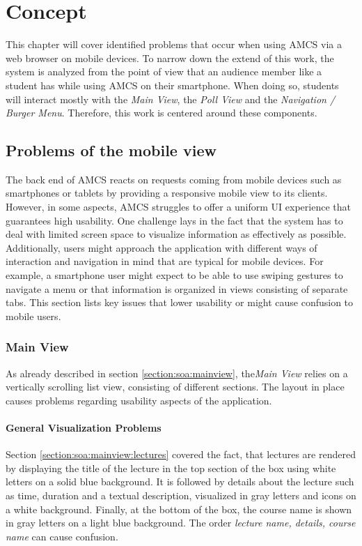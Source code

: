 \chapter{Concept}
\label{chapter:concept}
This chapter will cover identified problems that occur when using AMCS via a web browser on mobile
devices. To narrow down the extend of this work, the system is analyzed from the point of view that an audience member like a student has while using AMCS on their smartphone. When doing so, students will interact mostly with the \emph{Main View}, the \emph{Poll View} and the \emph{Navigation / Burger Menu}. Therefore, this work is centered around these components.

\section{Problems of the mobile view}
\label{section:con:problems}
The back end of AMCS reacts on requests coming from mobile devices such as smartphones or tablets by providing a responsive mobile view to its clients. However, in some aspects, AMCS struggles to offer a uniform UI experience that guarantees high usability.
One challenge lays in the fact that the system has to deal with limited screen space to visualize information as effectively as possible. Additionally, users might approach the application with different ways of interaction and navigation in mind that are typical for mobile devices. For example, a smartphone user might expect to be able to use swiping gestures to navigate a menu or that information is organized in views consisting of separate tabs. This section lists key issues that lower usability or might cause confusion to mobile users.

\subsection{Main View}
As already described in section \ref{section:soa:mainview}, the\emph{Main View} relies on a vertically scrolling list view, consisting of different sections. The layout in place causes problems regarding usability aspects of the application.

\subsubsection{General Visualization Problems}
\label{section:con:problems:mainview:generalvis}
Section \ref{section:soa:mainview:lectures} covered the fact, that lectures are rendered by displaying the title of the lecture in the top section of the box using white letters on a solid blue background. It is followed by details about the lecture such as time, duration and a textual description, visualized in gray letters and icons on a white background. Finally, at the bottom of the box, the course name is shown in gray letters on a light blue background. The order \emph{lecture name, details, course name} can cause confusion.

